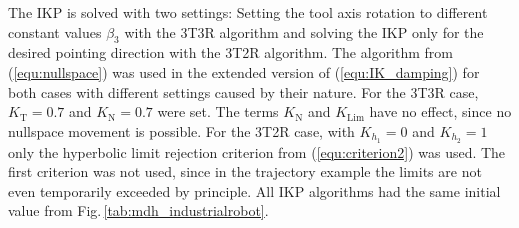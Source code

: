 \documentclass[robotics,article,submit,moreauthors,pdftex]{Definitions/mdpi}
\begin{document}
The IKP is solved with two settings: Setting the tool axis rotation to different constant values $\beta_3$ with the 3T3R algorithm and solving the IKP only for the  desired pointing direction with the 3T2R algorithm.
The algorithm from (\ref{equ:nullspace}) was used in the extended version of (\ref{equ:IK_damping}) for both cases with different settings caused by their nature.
For the 3T3R case, $K_\mathrm{T}=0.7$ and $K_\mathrm{N}=0.7$ were set.
The terms $K_\mathrm{N}$ and $K_\mathrm{Lim}$ have no effect, since no nullspace movement is possible.
For the 3T2R case, with $K_{h_1}=0$ and $K_{h_2}=1$ only the hyperbolic limit rejection criterion from (\ref{equ:criterion2}) was used.
The first criterion was not used, since in the trajectory example the limits are not even temporarily exceeded by principle.
All IKP algorithms had the same initial value from Fig.\,\ref{tab:mdh_industrialrobot}.
\end{document}
